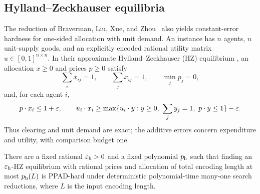 \subsection{Hylland--Zeckhauser equilibria}

The reduction of Braverman, Liu, Xue, and Zhou~\cite{HZ2026}
also yields constant-error hardness for one-sided allocation with
unit demand. An instance has $n$ agents, $n$ unit-supply goods, and
an explicitly encoded rational utility matrix $u\in[0,1]^{n\times n}$.
In their approximate Hylland--Zeckhauser (HZ) equilibrium
\cite[Definition~2.1]{HZ2026}, an allocation $x\geq0$ and prices
$p\geq0$ satisfy
\[
 \sum_i x_{ij}=1,\qquad \sum_j x_{ij}=1,\qquad \min_jp_j=0,
\]
and, for each agent $i$,
\[
 p\cdot x_i\leq1+\varepsilon,\qquad
 u_i\cdot x_i\geq
 \max\{u_i\cdot y:y\geq0,\ \sum_jy_j=1,\ p\cdot y\leq1\}-\varepsilon.
\]
Thus clearing and unit demand are exact; the additive errors concern
expenditure and utility, with comparison budget one.

\begin{corollary}
\label{cor:hz-hardness}
There are a fixed rational $\varepsilon_{\rm h}>0$ and a fixed polynomial
$p_{\rm h}$ such that finding an $\varepsilon_{\rm h}$-HZ equilibrium with
rational prices and allocation of total encoding length at most
$p_{\rm h}(L)$ is PPAD-hard under deterministic polynomial-time
many-one search reductions, where $L$ is the input encoding length.
\end{corollary}

